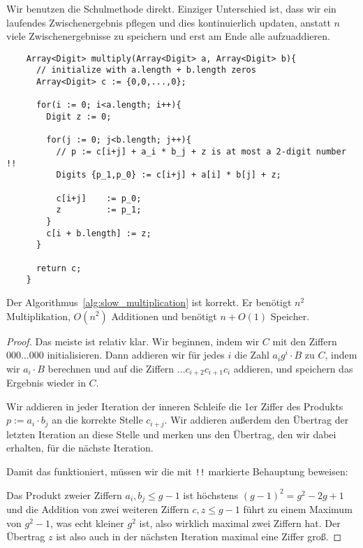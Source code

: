 \begin{algorithm}
    \label{alg:slow_multiplication}
    Wir benutzen die Schulmethode direkt. Einziger Unterschied ist, dass wir ein laufendes Zwischenergebnis pflegen und dies kontinuierlich updaten, anstatt $n$ viele Zwischenergebnisse zu speichern und erst am Ende alle aufzuaddieren.

    \begin{lstlisting}
    Array<Digit> multiply(Array<Digit> a, Array<Digit> b){
      // initialize with a.length + b.length zeros
      Array<Digit> c := {0,0,...,0};

      for(i := 0; i<a.length; i++){
        Digit z := 0;

        for(j := 0; j<b.length; j++){
          // p := c[i+j] + a_i * b_j + z is at most a 2-digit number !!
          Digits {p_1,p_0} := c[i+j] + a[i] * b[j] + z;

          c[i+j]    := p_0;
          z         := p_1;
        }
        c[i + b.length] := z;
      }

      return c;
    }
    \end{lstlisting}
\end{algorithm}

\begin{proposition}[Korrektheit]
    Der Algorithmus~\ref{alg:slow_multiplication} ist korrekt. Er benötigt $n^2$ Multiplikation, $O(n^2)$ Additionen und benötigt $n+O(1)$ Speicher.
\end{proposition}
\begin{proof}
    Das meiste ist relativ klar. Wir beginnen, indem wir $C$ mit den Ziffern $000\ldots 000$ initialisieren. Dann addieren wir für jedes $i$ die Zahl $a_i g^i\cdot B$ zu $C$, indem wir $a_i \cdot B$ berechnen und auf die Ziffern $\ldots c_{i+2}c_{i+1}c_i$ addieren, und speichern das Ergebnis wieder in $C$.

    \smallskip
    Wir addieren in jeder Iteration der inneren Schleife die 1er Ziffer des Produkts $p:=a_i \cdot b_j$ an die korrekte Stelle $c_{i+j}$. Wir addieren außerdem den Übertrag der letzten Iteration an diese Stelle und merken uns den Übertrag, den wir dabei erhalten, für die nächste Iteration.

    \smallskip
    Damit das funktioniert, müssen wir die mit \lstinline{!!} markierte Behauptung beweisen:

    Das Produkt zweier Ziffern $a_i,b_j\leq g-1$ ist höchstens $(g-1)^2=g^2-2g+1$ und die Addition von zwei weiteren Ziffern $c,z\leq g-1$ führt zu einem Maximum von $g^2-1$, was echt kleiner $g^2$ ist, also wirklich maximal zwei Ziffern hat. Der Übertrag $z$ ist also auch in der nächsten Iteration maximal eine Ziffer groß.
\end{proof}


